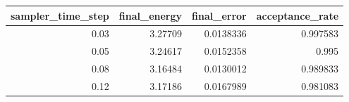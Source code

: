 \begin{tabular}{rrrr}
\toprule
sampler_time_step & final_energy & final_error & acceptance_rate \\
\midrule
0.03 & 3.27709 & 0.0138336 & 0.997583 \\
0.05 & 3.24617 & 0.0152358 & 0.995 \\
0.08 & 3.16484 & 0.0130012 & 0.989833 \\
0.12 & 3.17186 & 0.0167989 & 0.981083 \\
\bottomrule
\end{tabular}
